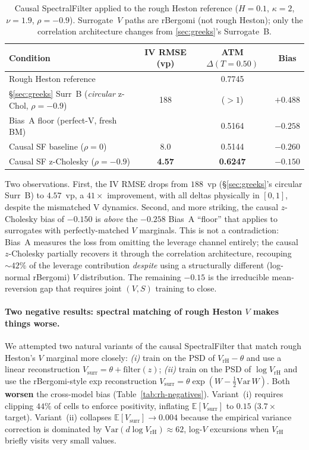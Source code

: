 \documentclass[11pt,a4paper]{article}
\newcommand{\E}{\mathbb{E}}
\begin{document}
\begin{table}[h]
\centering
\caption{Causal SpectralFilter applied to the rough Heston reference
($H=0.1$, $\kappa=2$, $\nu=1.9$, $\rho=-0.9$). Surrogate~$V$ paths are
rBergomi (not rough Heston); only the correlation architecture changes
from \cref{sec:greeks}'s Surrogate~B.}
\label{tab:rh-causal}
\begin{tabular}{lccc}
\toprule
Condition & IV RMSE (vp) & ATM $\Delta(T=0.50)$ & Bias \\
\midrule
Rough Heston reference            &     & 0.7745 &  \\
§\ref{sec:greeks} Surr~B (\emph{circular} z-Chol, $\rho=-0.9$) & 188  & ($>1$) & $+0.488$ \\
Bias~A floor (perfect-V, fresh BM)      &     & 0.5164 & $-0.258$ \\
Causal SF baseline ($\rho=0$)        & 8.0   & 0.5144 & $-0.260$ \\
Causal SF z-Cholesky ($\rho=-0.9$)      & \textbf{4.57} & \textbf{0.6247} & \textbf{$-0.150$} \\
\bottomrule
\end{tabular}
\end{table}

Two observations. First, the IV RMSE drops from $188$~vp
(§\ref{sec:greeks}'s circular Surr~B) to $4.57$~vp, a $41\times$
improvement, with all deltas physically in $[0,1]$, despite the
mismatched V dynamics. Second, and more striking, the causal
$z$-Cholesky bias of $-0.150$ is \emph{above} the $-0.258$ Bias~A
``floor'' that applies to surrogates with perfectly-matched $V$
marginals. This is not a contradiction: Bias~A measures the loss from
omitting the leverage channel entirely; the causal $z$-Cholesky
partially recovers it through the correlation architecture, recouping
$\sim\!42\%$ of the leverage contribution \emph{despite} using a
structurally different (log-normal rBergomi) $V$ distribution. The
remaining $-0.15$ is the irreducible mean-reversion gap that requires
joint $(V,S)$ training to close.

\medskip

\paragraph{Two negative results: spectral matching of rough Heston $V$
makes things worse.}
We attempted two natural variants of the causal SpectralFilter that
match rough Heston's $V$ marginal more closely:
\emph{(i)} train on the PSD of $V_{\mathrm{rH}}-\theta$ and use a linear
reconstruction $V_{\mathrm{surr}} = \theta + \mathrm{filter}(z)$;
\emph{(ii)} train on the PSD of $\log V_{\mathrm{rH}}$ and use the
rBergomi-style exp reconstruction
$V_{\mathrm{surr}} = \theta \exp(W - \tfrac{1}{2}\mathrm{Var}\,W)$.
Both \textbf{worsen} the cross-model bias (Table~\ref{tab:rh-negatives}).
Variant~(i) requires clipping $44\%$ of cells to enforce positivity,
inflating $\E[V_{\mathrm{surr}}]$ to $0.15$ ($3.7\times$ target).
Variant~(ii) collapses $\E[V_{\mathrm{surr}}]\to 0.004$ because the
empirical variance correction is dominated by
$\mathrm{Var}(d\log V_{\mathrm{rH}}) \approx 62$, log-$V$ excursions
when $V_{\mathrm{rH}}$ briefly visits very small values.
\end{document}

